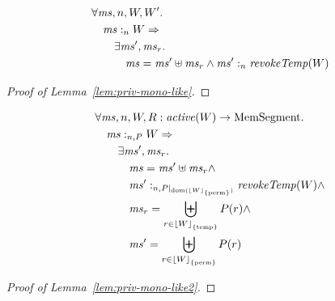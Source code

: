 \documentclass[a4paper]{article}
\DeclarePairedDelimiter\floor{\lfloor}{\rfloor}
\newcommand{\fun}{\rightarrow}
\DeclareMathOperator{\dom}{dom}
\newcommand\lau[1]{{\color{purple} \sf \footnotesize {LS: #1}}\\}
\newcommand\dominique[1]{{\color{purple} \sf \footnotesize {DD: #1}}\\}
\renewcommand\lau[1]{}
\renewcommand\dominique[1]{}
\newcommand{\var}[1]{\mathit{#1}}
\newcommand{\hs}{\var{ms}}
\newcommand{\ms}{\hs}
\newcommand{\heap}{\var{mem}}
\newcommand{\plainfun}[2]{
  \ifthenelse{\equal{#2}{}}
  {\mathit{#1}}
  {\mathit{#1}(#2)}
}
\newcommand{\erase}[2]{\floor*{#1}_{\{#2\}}}
\newcommand{\activeReg}[1]{\plainfun{active}{#1}}
\newcommand{\futurewk}{\mathbin{\sqsupseteq}^{\var{pub}}}
\newcommand{\heapSat}[3][\heap]{#1 :_{#2} #3}
\newcommand{\memSatPar}[4][n]{\heapSat[#2]{#1 , #4}{#3}}
\newcommand{\plaindom}[1]{\mathrm{#1}}
\newcommand{\HeapSegments}{\plaindom{MemSegment}}
\newcommand{\MemSegments}{\HeapSegments}
\newcommand{\plainview}[1]{\mathrm{#1}}
\newcommand{\perma}{\plainview{perm}}
\newcommand{\temp}{\plainview{temp}}
\begin{document}


\begin{lemma}
  \label{lem:priv-mono-like}
  \begin{align*}
    &      \forall \hs, n, W, W' \ldotp \\
    & \quad  \heapSat[\hs]{n}{W} \Rightarrow\\
    & \qquad \exists \hs', \hs_r \ldotp \\
    & \qquad \quad \hs = \hs' \uplus \hs_r \land \heapSat[\hs']{n}{\wrev{W}}
  \end{align*}
\end{lemma}
\begin{proof}[Proof of Lemma~\ref{lem:priv-mono-like}]
\end{proof}

\begin{lemma}
  \label{lem:priv-mono-like2}
  \begin{align*}
    & \forall \ms, n, W, R : \activeReg{W} \fun \MemSegments  \ldotp \\
    & \quad \memSatPar{\ms}{W}{P} \Rightarrow \\
    & \qquad \exists \ms', \ms_r\ldotp \\
    & \qquad \quad \ms = \ms' \uplus \ms_r \land \\
    & \qquad \quad \memSatPar{\ms'}{\wrev{W}}{P|_{\dom(\erase{W}{\perma})}} \land \\
    & \qquad \quad \ms_r = \biguplus_{r \in \erase{W}{\temp}} P(r) \land \\
    & \qquad \quad \ms' = \biguplus_{r \in \erase{W}{\perma}} P(r)
  \end{align*}
\end{lemma}
\begin{proof}[Proof of Lemma~\ref{lem:priv-mono-like2}]
\end{proof}
\end{document}
